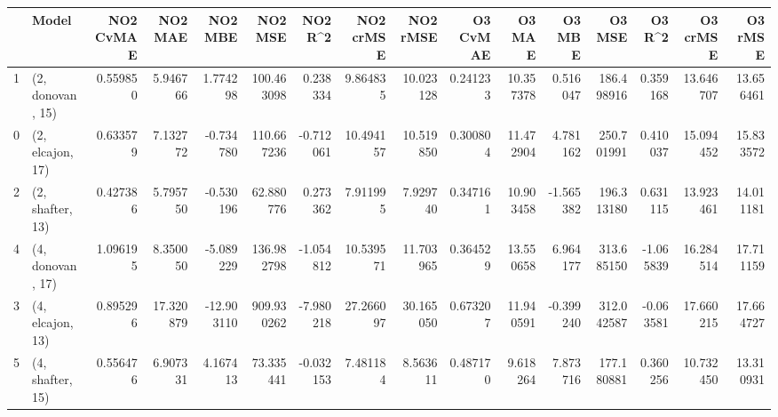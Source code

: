 \begin{tabular}{llrrrrrrrrrrrrrr}
\toprule
{} &             Model &  NO2 CvMAE &    NO2 MAE &    NO2 MBE &     NO2 MSE &   NO2 R\textasciicircum2 &  NO2 crMSE &   NO2 rMSE &  O3 CvMAE &     O3 MAE &    O3 MBE &      O3 MSE &    O3 R\textasciicircum2 &   O3 crMSE &    O3 rMSE \\
\midrule
1 &  (2, donovan, 15) &   0.559850 &   5.946766 &   1.774298 &  100.463098 &  0.238334 &   9.864835 &  10.023128 &  0.241233 &  10.357378 &  0.516047 &  186.498916 &  0.359168 &  13.646707 &  13.656461 \\
0 &  (2, elcajon, 17) &   0.633579 &   7.132772 &  -0.734780 &  110.667236 & -0.712061 &  10.494157 &  10.519850 &  0.300804 &  11.472904 &  4.781162 &  250.701991 &  0.410037 &  15.094452 &  15.833572 \\
2 &  (2, shafter, 13) &   0.427386 &   5.795750 &  -0.530196 &   62.880776 &  0.273362 &   7.911995 &   7.929740 &  0.347161 &  10.903458 & -1.565382 &  196.313180 &  0.631115 &  13.923461 &  14.011181 \\
4 &  (4, donovan, 17) &   1.096195 &   8.350050 &  -5.089229 &  136.982798 & -1.054812 &  10.539571 &  11.703965 &  0.364529 &  13.550658 &  6.964177 &  313.685150 & -1.065839 &  16.284514 &  17.711159 \\
3 &  (4, elcajon, 13) &   0.895296 &  17.320879 & -12.903110 &  909.930262 & -7.980218 &  27.266097 &  30.165050 &  0.673207 &  11.940591 & -0.399240 &  312.042587 & -0.063581 &  17.660215 &  17.664727 \\
5 &  (4, shafter, 15) &   0.556476 &   6.907331 &   4.167413 &   73.335441 & -0.032153 &   7.481184 &   8.563611 &  0.487170 &   9.618264 &  7.873716 &  177.180881 &  0.360256 &  10.732450 &  13.310931 \\
\bottomrule
\end{tabular}
